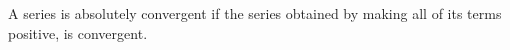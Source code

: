 A series is absolutely convergent if the series obtained by making all
of its terms positive, is convergent.